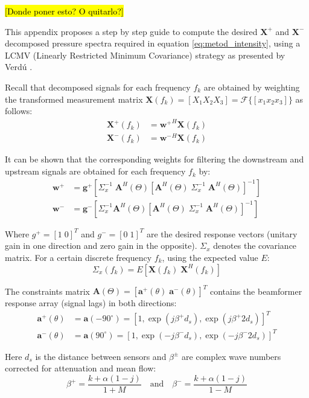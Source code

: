 \hl{[Donde poner esto? O quitarlo?]}

This appendix proposes a step by step guide to compute the desired $\mathbf X^+$ and $\mathbf X^-$ decomposed pressure spectra required in equation \ref{eq:metod_intensity}, using a LCMV (Linearly Restricted Minimum Covariance) strategy as presented by Verdú \cite{verdu2003contribucion}.

Recall that decomposed signals for each frequency $f_k$ are obtained by weighting the transformed measurement matrix $\mathbf X(f_k)=[X_1 X_2 X_3]=\mathcal F\{[x_1 x_2 x_3]\}$ as follows:
\begin{align}
    \mathbf X^+(f_k)&=\mathbf {w^+}^H\mathbf X(f_k)\\
    \mathbf X^-(f_k)&=\mathbf {w^-}^H\mathbf X(f_k)
\end{align}

It can be shown that the corresponding weights for filtering the downstream and upstream signals are obtained for each frequency $f_k$ by:
\begin{align}
    \mathbf w^+ &=\mathbf g^+\left[ \Sigma^{-1}_x\; \mathbf A^H(\Theta)\left[\mathbf A^H(\Theta)\; \Sigma^{-1}_x\; \mathbf A^H(\Theta)\right]^{-1}\right]\\
    \mathbf w^- &=\mathbf g^-\left[ \Sigma^{-1}_x \mathbf A^H(\Theta)\left[\mathbf A^H(\Theta)\; \Sigma^{-1}_x\; \mathbf A^H(\Theta)\right]^{-1}\right]
\end{align}

Where $g^+=[1\;0]^T$ and $g^-=[0\;1]^T$ are the desired response vectors (unitary gain in one direction and zero gain in the opposite). $\Sigma_x$ denotes the covariance matrix. For a certain discrete frequency $f_k$, using the expected value $E$:
\begin{equation}
  \Sigma_x(f_k)=E[\mathbf X(f_k)\;\mathbf X^H(f_k)]
\end{equation}

The constraints matrix $\mathbf A(\Theta)=[\mathbf a^+(\theta)\; \mathbf a^-(\theta)]^T$ contains the beamformer response array (signal lags) in both directions:
\begin{align}
    \mathbf a^+(\theta) &= \mathbf a(-90^\circ)=\left[1,\exp(j\beta^+d_s),\exp(j\beta^+2d_s)\right]^T\\
    \mathbf a^-(\theta) &= \mathbf a(90^\circ)=\left[1,\exp(-j\beta^-d_s),\exp(-j\beta^-2d_s)\right]^T
\end{align}

Here $d_s$ is the distance between sensors and $\beta^\pm$ are complex wave numbers corrected for attenuation and mean flow:
\begin{equation}
    \beta^+=\frac{k+\alpha(1-j)}{1+M}\quad\text{and}\quad\beta^-=\frac{k+\alpha(1-j)}{1-M}
\end{equation}

